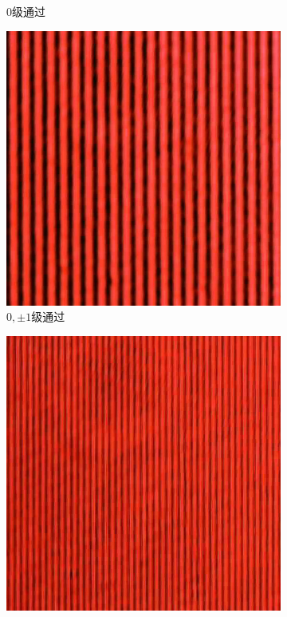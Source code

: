 \documentclass[a4paper]{article}
\begin{document}
\begin{figure}[H]
\begin{subfigure}[t]{0.3\textwidth}
        \caption{$0$级通过}
        \label{fig3-4-2}
    \end{subfigure}
    \begin{subfigure}[t]{0.3\textwidth}
        \centering
        \includegraphics[width=\textwidth]{img2-done/3-3.JPG}
        \caption{$0,\pm1$级通过}
        \label{fig3-4-3}
    \end{subfigure}
    \begin{subfigure}[t]{0.3\textwidth}
        \centering
        \includegraphics[width=\textwidth]{img2-done/3-4.JPG}

\end{subfigure}
\end{figure}
\end{document}
